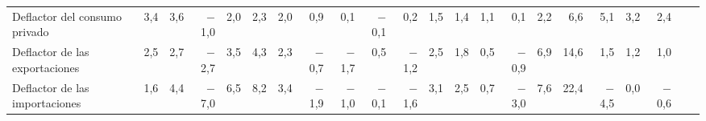 \begin{tabular}{@{}>{\raggedright\arraybackslash}p{\dimexpr\anchoetq-\tabcolsep\relax}*{21}{N}@{}}
Deflactor del consumo privado & 3{,}4 & 3{,}6 & $-$1{,}0 & 2{,}0 & 2{,}3 & 2{,}0 & 0{,}9 & 0{,}1 & $-$0{,}1 & 0{,}2 & 1{,}5 & 1{,}4 & 1{,}1 & 0{,}1 & 2{,}2 & 6{,}6 & 5{,}1 & 3{,}2 & 2{,}4 &  &  \\
Deflactor de las exportaciones & 2{,}5 & 2{,}7 & $-$2{,}7 & 3{,}5 & 4{,}3 & 2{,}3 & $-$0{,}7 & $-$1{,}7 & 0{,}5 & $-$1{,}2 & 2{,}5 & 1{,}8 & 0{,}5 & $-$0{,}9 & 6{,}9 & 14{,}6 & 1{,}5 & 1{,}2 & 1{,}0 &  &  \\
Deflactor de las importaciones & 1{,}6 & 4{,}4 & $-$7{,}0 & 6{,}5 & 8{,}2 & 3{,}4 & $-$1{,}9 & $-$1{,}0 & $-$0{,}1 & $-$1{,}6 & 3{,}1 & 2{,}5 & 0{,}7 & $-$3{,}0 & 7{,}6 & 22{,}4 & $-$4{,}5 & 0{,}0 & $-$0{,}6 &  &  \\
\bottomrule
\end{tabular}
